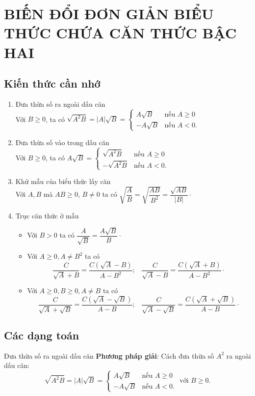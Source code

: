 \section{BIẾN ĐỔI ĐƠN GIẢN BIỂU THỨC CHỨA CĂN THỨC BẬC HAI}
\subsection{Kiến thức cần nhớ}
\begin{enumerate}
\item Đưa thừa số ra ngoài dấu căn \\
Với $B\ge 0$, ta có $\sqrt{A^2B}=|A|\sqrt{B}=\begin{cases}
A\sqrt{B} &\text{nếu } A\ge 0\\
-A\sqrt{B} &\text{nếu } A<0.
\end{cases}$
\item Đưa thừa số vào trong dấu căn\\
	Với $B\ge 0$, ta có $A\sqrt{B}=\begin{cases}
\sqrt{A^2B} &\text{nếu } A\ge 0\\
-\sqrt{A^2B} &\text{nếu } A<0.
\end{cases}$
\item Khử mẫu của biểu thức lấy căn\\
Với $A,B$ mà $AB\ge 0$, $B\ne 0$ ta có $\sqrt{\dfrac{A}{B}}=\sqrt{\dfrac{AB}{B^2}}=\dfrac{\sqrt{AB}}{|B|}\cdot$
\item Trục căn thức ở mẫu
\begin{itemize}
\item Với $B>0$ ta có $\dfrac{A}{\sqrt{B}}=\dfrac{A\sqrt{B}}{B}\cdot$
\item Với $A\ge 0, A\ne B^2$ ta có $$\dfrac{C}{\sqrt{A}+B}=\dfrac{C\left(\sqrt{A}-B\right)}{A-B^2};\;\;\;\dfrac{C}{\sqrt{A}-B}=\dfrac{C\left(\sqrt{A}+B\right)}{A-B^2}\cdot$$
\item Với $A\ge 0, B\ge 0, A\ne B$ ta có $$\dfrac{C}{\sqrt{A}+\sqrt{B}}=\dfrac{C\left(\sqrt{A}-\sqrt{B}\right)}{A-B};\;\;\;\dfrac{C}{\sqrt{A}-\sqrt{B}}=\dfrac{C\left(\sqrt{A}+\sqrt{B}\right)}{A-B}\cdot$$
\end{itemize}
\end{enumerate}
\subsection{Các dạng toán}

\begin{dang}{Đưa thừa số ra ngoài dấu căn}
    \textbf{Phương pháp giải}: Cách đưa thừa số $A^2$ ra ngoài dấu căn:
$$\sqrt{A^2B}=|A|\sqrt{B}=\begin{cases}
A\sqrt{B} &\text{nếu } A\ge 0\\
-A\sqrt{B} &\text{nếu } A<0.
\end{cases} \text{ với $B\ge 0$}.$$
\end{dang}

